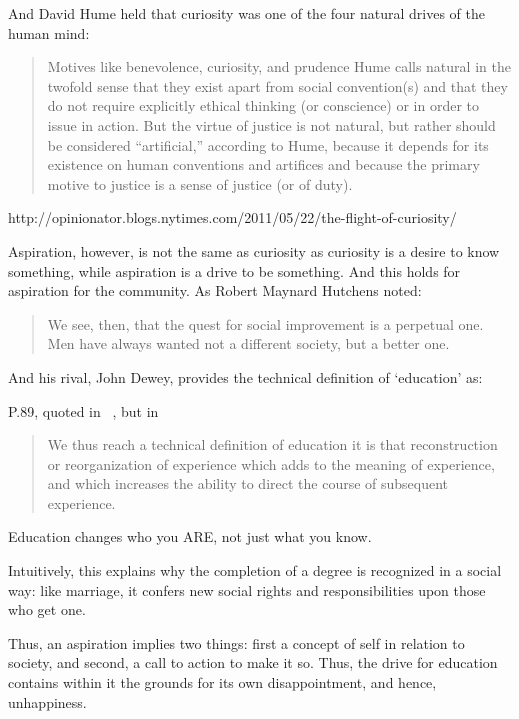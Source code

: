 And David Hume held that curiosity was one of the four natural drives of the human mind:

\begin{quote}

Motives like benevolence, curiosity, and prudence Hume calls natural in the twofold sense that they exist apart from social convention(s) and that they do not require explicitly ethical thinking (or conscience) or in order to issue in action. But the virtue of justice is not natural, but rather should be considered ``artificial,'' according to Hume, because it depends for its existence on human conventions and artifices and because the primary motive to justice is a sense of justice (or of duty).
\end{quote}

http:\slash \slash opinionator.blogs.nytimes.com\slash 2011\slash 05\slash 22\slash the-flight-of-curiosity\slash 

Aspiration, however, is not the same as curiosity as curiosity is a desire to know something, while aspiration is a drive to be something. And this holds for aspiration for the community. As Robert Maynard Hutchens noted:

\begin{quote}

We see, then, that the quest for social improvement is a perpetual one. Men have always wanted not a different society, but a better one. ~\citep[p. 10]{Hutchins:1943ts}
\end{quote}

And his rival, John Dewey, provides the technical definition of `education' as:

P.89, quoted in ~\citep{Kneller:1971wq}, but in ~\citep{Dewey:1916tl}

\begin{quote}

We thus reach a technical definition of education it is that reconstruction or reorganization of experience which adds to the meaning of experience, and which increases the ability to direct the course of subsequent experience. 
\end{quote}

Education changes who you ARE, not just what you know.

Intuitively, this explains why the completion of a degree is recognized in a social way: like marriage, it confers new social rights and responsibilities upon those who get one.

Thus, an aspiration implies two things: first a concept of self in relation to society, and second, a call to action to make it so. Thus, the drive for education contains within it the grounds for its own disappointment, and hence, unhappiness.

